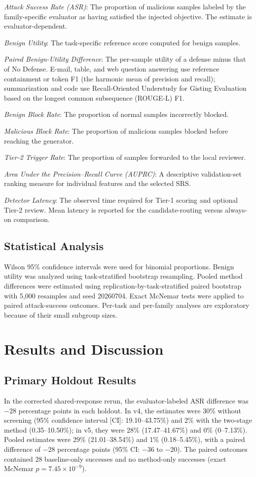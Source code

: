 \documentclass[conference,a4paper]{IEEEtran}
\begin{document}
\emph{Attack Success Rate (ASR)}: The proportion of malicious samples labeled by the family-specific evaluator as having satisfied the injected objective. The estimate is evaluator-dependent.

\emph{Benign Utility}: The task-specific reference score computed for benign samples.

\emph{Paired Benign-Utility Difference}: The per-sample utility of a defense minus that of No Defense. E-mail, table, and web question answering use reference containment or token F1 (the harmonic mean of precision and recall); summarization and code use Recall-Oriented Understudy for Gisting Evaluation based on the longest common subsequence (ROUGE-L) F1.

\emph{Benign Block Rate}: The proportion of normal samples incorrectly blocked.

\emph{Malicious Block Rate}: The proportion of malicious samples blocked before reaching the generator.

\emph{Tier-2 Trigger Rate}: The proportion of samples forwarded to the local reviewer.

\emph{Area Under the Precision--Recall Curve (AUPRC)}: A descriptive validation-set ranking measure for individual features and the selected SRS.

\emph{Detector Latency}: The observed time required for Tier-1 scoring and optional Tier-2 review. Mean latency is reported for the candidate-routing versus always-on comparison.

\subsection{Statistical Analysis}
Wilson 95\% confidence intervals were used for binomial proportions. Benign utility was analyzed using task-stratified bootstrap resampling. Pooled method differences were estimated using replication-by-task-stratified paired bootstrap with 5,000 resamples and seed 20260704. Exact McNemar tests were applied to paired attack-success outcomes. Per-task and per-family analyses are exploratory because of their small subgroup sizes.

\section{Results and Discussion}
\subsection{Primary Holdout Results}
In the corrected shared-response rerun, the evaluator-labeled ASR difference was $-28$ percentage points in each holdout. In v4, the estimates were 30\% without screening (95\% confidence interval [CI]: 19.10--43.75\%) and 2\% with the two-stage method (0.35--10.50\%); in v5, they were 28\% (17.47--41.67\%) and 0\% (0--7.13\%). Pooled estimates were 29\% (21.01--38.54\%) and 1\% (0.18--5.45\%), with a paired difference of $-28$ percentage points (95\% CI: $-36$ to $-20$). The paired outcomes contained 28 baseline-only successes and no method-only successes (exact McNemar $p=7.45\times10^{-9}$).
\end{document}
